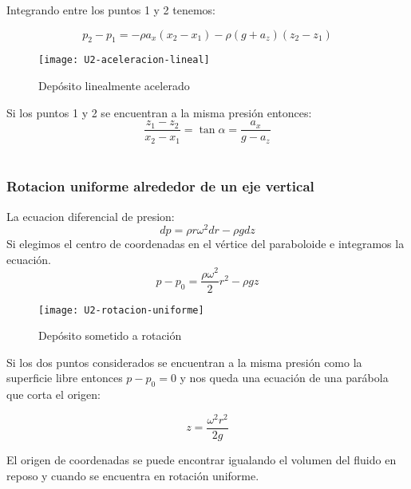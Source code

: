 Integrando entre los puntos 1 y 2 tenemos:

\begin{equation}
	p_{2}- p_{1} = - \rho a_{x}(x_{2}-x_{1}) - \rho(g + a_{z}) (z_{2}-z_{1})
\end{equation}
\begin{figure}[h]
	\centering
	\texttt{[image: U2-aceleracion-lineal]}
	\caption{Depósito linealmente acelerado}
\end{figure}

Si los puntos 1 y 2 se encuentran a la misma presión entonces:
\begin{equation}
	\dfrac{z_{1}-z_{2}}{x_{2}-x_{1}} = \tan \alpha = \dfrac{a_{x}}{g-a_{z}}
\end{equation}
\\
\subsubsection{Rotacion uniforme alrededor de un eje vertical}

La ecuacion diferencial de presion:
\begin{equation}
	dp = \rho r \omega^{2} dr - \rho g dz
\end{equation}
Si elegimos el centro de coordenadas en el vértice del paraboloide e integramos la ecuación.
\begin{equation}
	p -p_{0} = \dfrac{\rho \omega^{2} }{2} r^{2} - \rho g z
\end{equation}
\begin{figure}[h]
	\centering
	\texttt{[image: U2-rotacion-uniforme]}
	\caption{Depósito sometido a rotación}
\end{figure}
Si los dos puntos considerados se encuentran a la misma presión como la superficie libre entonces $p - p_{0} = 0$ y nos queda una ecuación de una parábola que corta el origen:

\begin{equation}
	z = \dfrac{\omega^{2} r^{2} }{2 g}
\end{equation}

El origen de coordenadas se puede encontrar igualando el volumen del fluido en reposo y cuando se encuentra en rotación uniforme.
